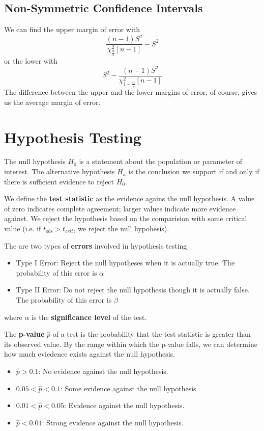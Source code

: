 \documentclass[12pt]{article}
\begin{document}
\subsection*{Non-Symmetric Confidence Intervals}
We can find the upper margin of error with \[ \frac{(n-1)S^2}{\chi^2_{\frac{\alpha}{2}} [n-1]} - S^2 \] or the lower with \[ S^2 - \frac{(n-1)S^2}{\chi^2_{1-\frac{\alpha}{2}} [n-1]} \] The difference between the upper and the lower margins of error, of course, gives us the average margin of error.

\section*{Hypothesis Testing}
The null hypothesis $H_0$ is a statement about the population or parameter of interest. The alternative hypothesis $H_a$ is the conclusion we support if and only if there is sufficient evidence to reject $H_0$.

We define the {\bf test statistic} as the evidence agains the null hypothesis. A value of zero indicates complete agreement; larger values indicate more evidence against. We reject the hypothesis based on the comparision with some critical value (i.e. if $t_{obs} > t_{crit}$, we reject the null hypohesis).

The are two types of {\bf errors} involved in hypothesis testing
\begin{itemize}
\item Type I Error: Reject the null hypotheses when it is actually true. The probability of this error is $\alpha$
\item Type II Error: Do not reject the null hypothesis though it is actually false. The probability of this error is $\beta$
\end{itemize}
where $\alpha$ is the {\bf significance level} of the test.

The {\bf p-value} $\hat{p}$ of a test is the probability that the test statistic is greater than its observed value. By the range within which the p-value falls, we can determine how much eviedence exists against the null hypothesis.
\begin{itemize}
\item $\hat{p} > 0.1$: No evidence against the null hypothesis.
\item $0.05 < \hat{p} < 0.1$: Some evidence against the null hypothesis.
\item $0.01 < \hat{p} < 0.05$: Evidence against the null hypothesis.
\item $\hat{p} < 0.01$: Strong evidence against the null hypothesis.
\end{itemize}
\end{document}
